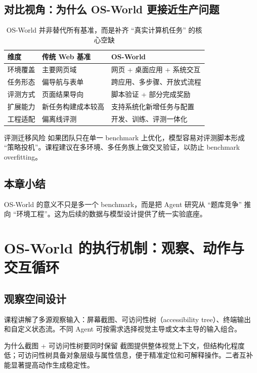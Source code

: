 \documentclass[a4paper]{article}
\begin{document}
\subsection{对比视角：为什么 OS-World 更接近生产问题}
\begin{table}[H]
\centering
\begin{tabular}{p{3.2cm}p{3.7cm}p{3.8cm}}
\toprule
\textbf{维度} & \textbf{传统 Web 基准} & \textbf{OS-World} \\
\midrule
环境覆盖 & 主要网页域 & 网页 + 桌面应用 + 系统交互 \\
任务形态 & 偏导航与表单 & 跨应用、多步骤、开放式流程 \\
评测方式 & 页面结果导向 & 脚本验证 + 部分完成奖励 \\
扩展能力 & 新任务构建成本较高 & 支持系统化新增任务与配置 \\
工程适配 & 偏离线评测 & 开发、训练、评测一体化 \\
\bottomrule
\end{tabular}
\caption{OS-World 并非替代所有基准，而是补齐 ``真实计算机任务'' 的核心空缺}
\end{table}

\begin{warningbox}{评测迁移风险}
如果团队只在单一 benchmark 上优化，模型容易对评测脚本形成 ``策略投机''。课程建议在多环境、多任务族上做交叉验证，以防止 benchmark overfitting。
\end{warningbox}

\subsection{本章小结}
OS-World 的意义不只是多一个 benchmark，而是把 Agent 研究从 ``题库竞争'' 推向 ``环境工程''。这为后续的数据与模型设计提供了统一实验底座。

\section{OS-World 的执行机制：观察、动作与交互循环}

\subsection{观察空间设计}
课程讲解了多源观察输入：屏幕截图、可访问性树（accessibility tree）、终端输出和自定义状态流。不同 Agent 可按需求选择视觉主导或文本主导的输入组合。

\begin{knowledgebox}{为什么截图 + 可访问性树要同时保留}
截图提供整体视觉上下文，但结构化程度低；可访问性树具备对象层级与属性信息，便于精准定位和可解释操作。二者互补能显著提高动作生成稳定性。
\end{knowledgebox}
\end{document}
